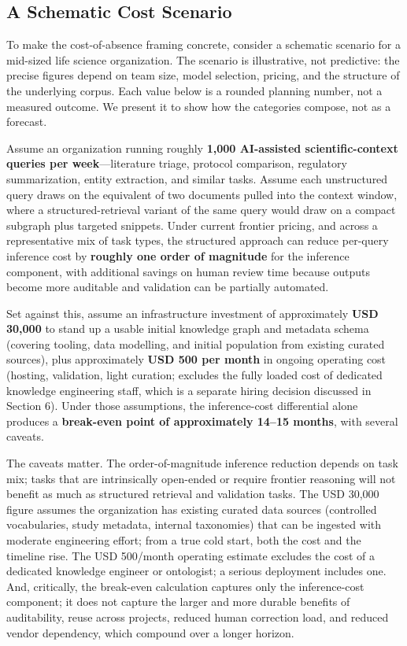 \documentclass[man,12pt,donotrepeattitle]{apa7}
\begin{document}
\subsection{A Schematic Cost Scenario}

To make the cost-of-absence framing concrete, consider a schematic scenario
for a mid-sized life science organization. The scenario is illustrative, not
predictive: the precise figures depend on team size, model selection,
pricing, and the structure of the underlying corpus. Each value below is a
rounded planning number, not a measured outcome. We present it to show how
the categories compose, not as a forecast.

Assume an organization running roughly \textbf{1,000 AI-assisted
scientific-context queries per week}---literature triage, protocol
comparison, regulatory summarization, entity extraction, and similar tasks.
Assume each unstructured query draws on the equivalent of two documents
pulled into the context window, where a structured-retrieval variant of the
same query would draw on a compact subgraph plus targeted snippets. Under
current frontier pricing, and across a representative mix of task types, the
structured approach can reduce per-query inference cost by \textbf{roughly
one order of magnitude} for the inference component, with additional savings
on human review time because outputs become more auditable and validation can
be partially automated.

Set against this, assume an infrastructure investment of approximately
\textbf{USD 30,000} to stand up a usable initial knowledge graph and
metadata schema (covering tooling, data modelling, and initial population
from existing curated sources), plus approximately \textbf{USD 500 per
month} in ongoing operating cost (hosting, validation, light curation;
excludes the fully loaded cost of dedicated knowledge engineering staff,
which is a separate hiring decision discussed in Section 6). Under those
assumptions, the inference-cost differential alone produces a \textbf{break-even
point of approximately 14--15 months}, with several caveats.

The caveats matter. The order-of-magnitude inference reduction depends on
task mix; tasks that are intrinsically open-ended or require frontier
reasoning will not benefit as much as structured retrieval and validation
tasks. The USD 30,000 figure assumes the organization has existing curated
data sources (controlled vocabularies, study metadata, internal taxonomies)
that can be ingested with moderate engineering effort; from a true cold
start, both the cost and the timeline rise. The USD 500/month operating
estimate excludes the cost of a dedicated knowledge engineer or ontologist;
a serious deployment includes one. And, critically, the break-even
calculation captures only the inference-cost component; it does not capture
the larger and more durable benefits of auditability, reuse across projects,
reduced human correction load, and reduced vendor dependency, which compound
over a longer horizon.
\end{document}
